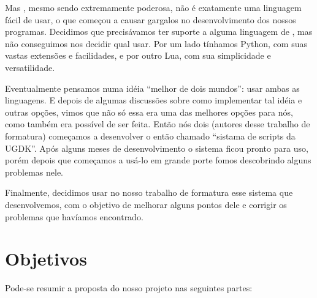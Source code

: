 
Mas \CXX{}, mesmo sendo extremamente poderosa, não é exatamente uma linguagem
fácil de usar, o que começou a causar gargalos no desenvolvimento
dos nossos programas. Decidimos que precisávamos ter suporte a alguma linguagem
de \script{}, mas não conseguimos nos decidir qual usar. Por um lado tínhamos
Python, com suas vastas extensões e facilidades, e por outro Lua, com sua
simplicidade e versatilidade.

Eventualmente pensamos numa idéia ``melhor de dois mundos'': usar ambas as linguagens.
E depois de algumas discussões sobre como implementar tal idéia e outras opções,
vimos que não só essa era uma das melhores opções para nós, como também era
possível de ser feita. Então nós dois (autores desse trabalho de formatura) começamos
a desenvolver o então chamado ``sistama de scripts da UGDK''. Após alguns meses
de desenvolvimento o sistema ficou pronto para uso, porém depois que começamos 
a usá-lo em grande porte fomos descobrindo alguns problemas nele.

Finalmente, decidimos usar no nosso trabalho de formatura esse sistema que
desenvolvemos, com o objetivo de melhorar alguns pontos dele e corrigir
os problemas que havíamos encontrado.

\section{Objetivos}
\label{sec:intr:objetivos}

Pode-se resumir a proposta do nosso projeto nas seguintes partes:


